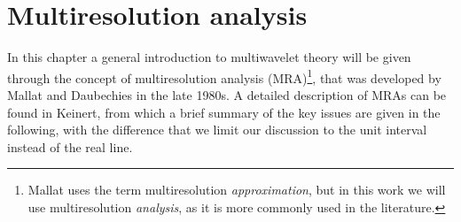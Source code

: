 \chapter{Multiresolution analysis}\label{chap:mathematics}
In this chapter a general introduction to multiwavelet theory will be given through 
the concept of multiresolution analysis (MRA)\footnote{Mallat uses the term 
multiresolution \emph{approximation}, but in this work we will use multiresolution 
\emph{analysis}, as it is more commonly used in the literature.}, that was developed 
by Mallat\cite{Mallat:1989} and Daubechies\cite{Daubechies:1988} in the late 1980s. 
A detailed description of MRAs can be found in Keinert\cite{Keinert:2004}, from 
which a brief summary of the key issues are given in the following, with the 
difference that we limit our discussion to the unit interval instead of the real line.


